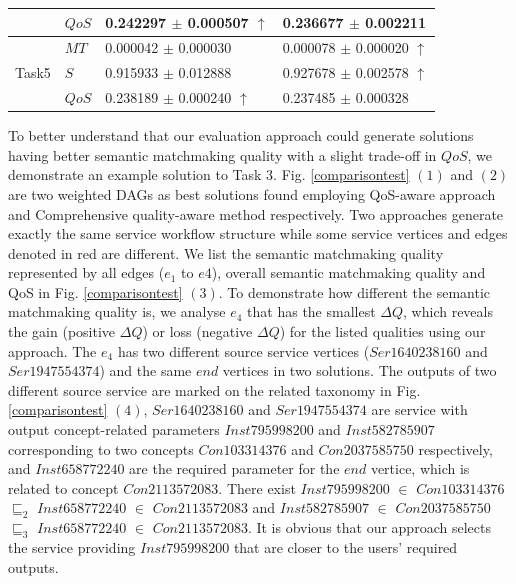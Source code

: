 \documentclass{llncs}
\begin{document}
\begin{table}[]
\begin{tabular}{l|l|l|l}
                        &$QoS$  &0.242297 $\pm$ 0.000507 $\uparrow$    &0.236677 $\pm$ 0.002211  \\ \hline
\multirow{3}{*}{Task5}  &$MT$   &  0.000042 $\pm$ 0.000030             &0.000078 $\pm$ 0.000020 $\uparrow$           \\ \cline{2-4} 
                        &$S$    &  0.915933 $\pm$ 0.012888             &0.927678 $\pm$ 0.002578 $\uparrow$                 \\ \cline{2-4}
                        &$QoS$  & 0.238189 $\pm$ 0.000240 $\uparrow$      &  0.237485 $\pm$  0.000328  \\ \hline                                                   
\end{tabular}
\end{table}

To better understand that our evaluation approach could generate solutions having better semantic matchmaking quality with a slight trade-off in $QoS$, we demonstrate an example solution to Task 3. Fig. \ref{comparisontest} $(1)$ and $(2)$ are two weighted DAGs as best solutions found employing QoS-aware approach and Comprehensive quality-aware method respectively. Two approaches generate exactly the same service workflow structure while some service vertices and edges denoted in red are different. We list the semantic matchmaking quality represented by all edges ($e_1$ to $e4$), overall semantic matchmaking quality and QoS in Fig. \ref{comparisontest} $(3)$. To demonstrate how different the semantic matchmaking quality is, we analyse $e_4$ that has the smallest $\Delta Q$, which reveals the gain (positive $\Delta Q$) or loss (negative $\Delta Q$) for the listed qualities using our approach. The $e_4$ has two different source service vertices ($Ser1640238160$ and $Ser1947554374$) and the same $end$ vertices in two solutions. The outputs of two different source service are marked on the related taxonomy in Fig. \ref{comparisontest} $(4)$, $Ser1640238160$ and $Ser1947554374$ are service with output concept-related parameters $Inst795998200$ and $Inst582785907$ corresponding to two concepts $Con103314376$ and $Con2037585750$ respectively, and $Inst658772240$ are the required parameter for the $end$ vertice, which is related to concept $Con2113572083$. There exist $Inst795998200$ $\in$ $Con103314376$ $\sqsubseteq_{2}$ $Inst658772240$ $\in$ $Con2113572083$ and $Inst582785907$ $\in$ $Con2037585750$ $\sqsubseteq_{3}$ $Inst658772240$ $\in$ $Con2113572083$. It is obvious that our approach selects the service providing $Inst795998200$ that are closer to the users' required outputs.
\end{document}
